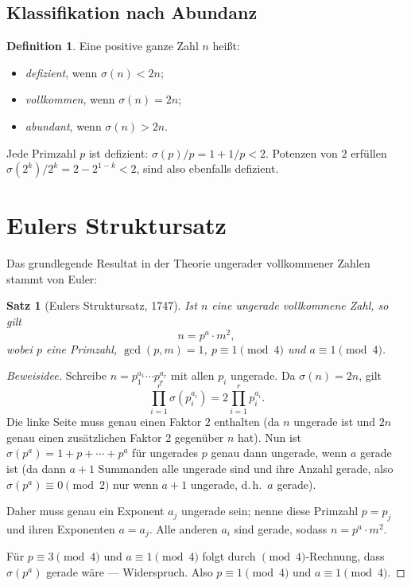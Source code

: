 \documentclass[12pt,a4paper]{amsart}
\newtheorem{satz}[theorem]{Satz}
\theoremstyle{definition}
\newtheorem{definition_de}[theorem]{Definition}
\theoremstyle{remark}
\begin{document}
\subsection{Klassifikation nach Abundanz}

\begin{definition_de}
Eine positive ganze Zahl $n$ heißt:
\begin{itemize}[nosep]
  \item \emph{defizient}, wenn $\sigma(n) < 2n$;
  \item \emph{vollkommen}, wenn $\sigma(n) = 2n$;
  \item \emph{abundant}, wenn $\sigma(n) > 2n$.
\end{itemize}
\end{definition_de}

Jede Primzahl $p$ ist defizient: $\sigma(p)/p = 1 + 1/p < 2$.
Potenzen von $2$ erfüllen $\sigma(2^k)/2^k = 2 - 2^{1-k} < 2$, sind also
ebenfalls defizient.

\section{Eulers Struktursatz}

Das grundlegende Resultat in der Theorie ungerader vollkommener Zahlen
stammt von Euler:

\begin{satz}[Eulers Struktursatz, 1747]
\label{satz:euler}
Ist $n$ eine ungerade vollkommene Zahl, so gilt
\[
  n = p^a \cdot m^2,
\]
wobei $p$ eine Primzahl, $\gcd(p, m) = 1$, $p \equiv 1 \pmod{4}$
und $a \equiv 1 \pmod{4}$.
\end{satz}

\begin{proof}[Beweisidee]
Schreibe $n = p_1^{a_1} \cdots p_r^{a_r}$ mit allen $p_i$ ungerade.
Da $\sigma(n) = 2n$, gilt
\[
  \prod_{i=1}^r \sigma(p_i^{a_i}) = 2 \prod_{i=1}^r p_i^{a_i}.
\]
Die linke Seite muss genau einen Faktor $2$ enthalten (da $n$ ungerade ist
und $2n$ genau einen zusätzlichen Faktor $2$ gegenüber $n$ hat).
Nun ist $\sigma(p^a) = 1 + p + \cdots + p^a$ für ungerades $p$ genau dann
ungerade, wenn $a$ gerade ist (da dann $a+1$ Summanden alle ungerade sind
und ihre Anzahl gerade, also $\sigma(p^a) \equiv 0 \pmod{2}$ nur wenn
$a+1$ ungerade, d.\,h.\ $a$ gerade).

Daher muss genau ein Exponent $a_j$ ungerade sein; nenne diese Primzahl
$p = p_j$ und ihren Exponenten $a = a_j$.
Alle anderen $a_i$ sind gerade, sodass $n = p^a \cdot m^2$.

Für $p \equiv 3 \pmod{4}$ und $a \equiv 1 \pmod{4}$ folgt durch
$\pmod{4}$-Rechnung, dass $\sigma(p^a)$ gerade wäre --- Widerspruch.
Also $p \equiv 1 \pmod{4}$ und $a \equiv 1 \pmod{4}$.
\end{proof}
\end{document}
